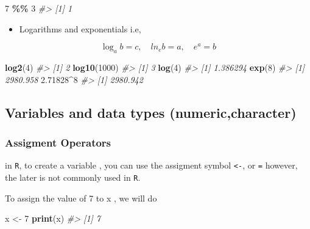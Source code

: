 \documentclass[
]{book}
\newenvironment{Shaded}{\begin{snugshade}}{\end{snugshade}}
\newcommand{\CommentTok}[1]{\textcolor[rgb]{0.56,0.35,0.01}{\textit{#1}}}
\newcommand{\DecValTok}[1]{\textcolor[rgb]{0.00,0.00,0.81}{#1}}
\newcommand{\FloatTok}[1]{\textcolor[rgb]{0.00,0.00,0.81}{#1}}
\newcommand{\FunctionTok}[1]{\textcolor[rgb]{0.13,0.29,0.53}{\textbf{#1}}}
\newcommand{\NormalTok}[1]{#1}
\newcommand{\OtherTok}[1]{\textcolor[rgb]{0.56,0.35,0.01}{#1}}
\newcommand{\SpecialCharTok}[1]{\textcolor[rgb]{0.81,0.36,0.00}{\textbf{#1}}}
\providecommand{\tightlist}{%
  \setlength{\itemsep}{0pt}\setlength{\parskip}{0pt}}
\begin{document}
\begin{Shaded}
\begin{Highlighting}[]
\DecValTok{7} \SpecialCharTok{\%\%} \DecValTok{3}
\CommentTok{\#\textgreater{} [1] 1}
\end{Highlighting}
\end{Shaded}

\begin{itemize}
\tightlist
\item
  Logarithms and exponentials
  i.e,
\end{itemize}

\[\log_a b = c,\quad ln_e b=a , \quad  e^{a}=b\]

\begin{Shaded}
\begin{Highlighting}[]
\FunctionTok{log2}\NormalTok{(}\DecValTok{4}\NormalTok{)}
\CommentTok{\#\textgreater{} [1] 2}
\FunctionTok{log10}\NormalTok{(}\DecValTok{1000}\NormalTok{)}
\CommentTok{\#\textgreater{} [1] 3}
\FunctionTok{log}\NormalTok{(}\DecValTok{4}\NormalTok{)}
\CommentTok{\#\textgreater{} [1] 1.386294}
\FunctionTok{exp}\NormalTok{(}\DecValTok{8}\NormalTok{)}
\CommentTok{\#\textgreater{} [1] 2980.958}
\FloatTok{2.71828}\SpecialCharTok{\^{}}\DecValTok{8}
\CommentTok{\#\textgreater{} [1] 2980.942}
\end{Highlighting}
\end{Shaded}

\subsection*{Variables and data types (numeric,character)}\label{variables-and-data-types-numericcharacter}

\subsubsection*{Assigment Operators}\label{assigment-operators}

in \texttt{R}, to create a variable , you can use the assigment symbol \texttt{\textless{}-}, or \texttt{=} however, the later is not commonly used in \texttt{R}.

To assign the value of 7 to x , we will do

\begin{Shaded}
\begin{Highlighting}[]
\NormalTok{x }\OtherTok{\textless{}{-}} \DecValTok{7}
\FunctionTok{print}\NormalTok{(x)}
\CommentTok{\#\textgreater{} [1] 7}
\end{Highlighting}
\end{Shaded}
\end{document}
